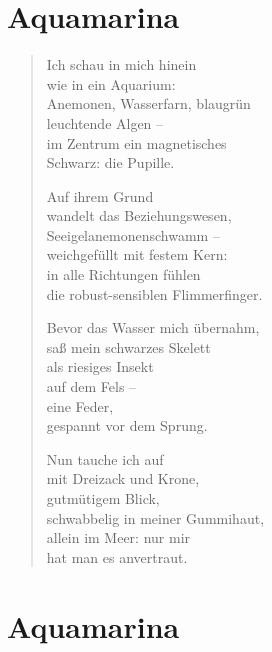 
\cleartoverso

\section{Aquamarina}

\vspace*{-\baselineskip}
\begin{verse}

Ich schau in mich hinein\\
wie in ein Aquarium:\\
Anemonen, Wasserfarn, blaugrün\\
leuchtende Algen --\\
im Zentrum ein magnetisches\\
Schwarz: die Pupille.

Auf ihrem Grund\\
wandelt das Beziehungswesen,\\
Seeigelanemonenschwamm --\\
weichgefüllt mit festem Kern:\\
in alle Richtungen fühlen\\
die robust-sensiblen Flimmerfinger.

Bevor das Wasser mich übernahm,\\
saß mein schwarzes Skelett\\
als riesiges Insekt\\
auf dem Fels --\\
eine Feder,\\
gespannt vor dem Sprung.

Nun tauche ich auf\\
mit Dreizack und Krone,\\
gutmütigem Blick,\\
schwabbelig in meiner Gummihaut,\\
allein im Meer: nur mir\\
hat man es anvertraut.

\end{verse}

\clearpage

\section{Aquamarina}

